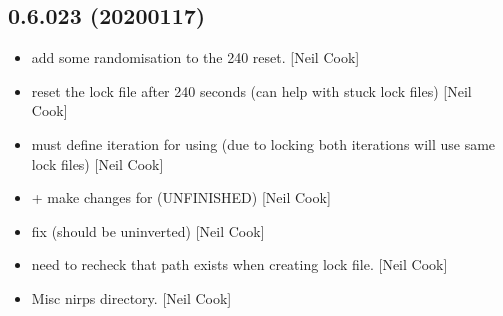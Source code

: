 \documentclass[a4paper,10pt,english]{report}
\begin{document}
\subsection{0.6.023 (2020\sphinxhyphen{}01\sphinxhyphen{}17)}
\label{\detokenize{misc/changelog:id14}}\begin{itemize}
\item {} 
 \sphinxhyphen{} add some randomisation to the 240 reset. {[}Neil Cook{]}

\item {} 
 \sphinxhyphen{} reset the lock file after 240 seconds (can help with
stuck lock files) {[}Neil Cook{]}

\item {} 
 \sphinxhyphen{} must define iteration for using
 (due to locking \textendash{} both iterations will use same lock
files) {[}Neil Cook{]}

\item {} 
 +  \sphinxhyphen{}
make changes for  (UNFINISHED) {[}Neil Cook{]}

\item {} 
 \sphinxhyphen{} fix  (should be un\sphinxhyphen{}inverted) {[}Neil
Cook{]}

\item {} 
 \sphinxhyphen{} need to re\sphinxhyphen{}check that path exists when creating lock
file. {[}Neil Cook{]}

\item {} 
Misc nirps directory. {[}Neil Cook{]}

\end{itemize}
\end{document}
